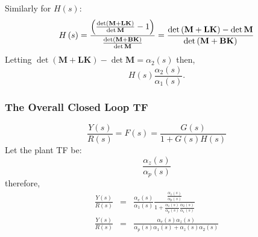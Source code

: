 Similarly for $H(s)$:
\[
H\left( s \right) = \frac{{\left( {\frac{{\det \left( {{\bf{M}} + {\bf{LK}}} \right)}}{{\det {\bf{M}}}} - 1} \right)}}{{\frac{{\det \left( {{\bf{M}} + {\bf{BK}}} \right)}}{{\det {\bf{M}}}}}} = \frac{{\det \left( {{\bf{M}} + {\bf{LK}}} \right) - \det {\bf{M}}}}{{\det \left( {{\bf{M}} + {\bf{BK}}} \right)}}
\]
Letting $\det\left(\mathbf{M}+\mathbf{LK}\right)-\det\mathbf{M}=\alpha_2(s)$ then,
\[
H(s)\frac{\alpha_2(s)}{\alpha_1(s)}.
\]



\subsubsection*{The Overall Closed Loop TF} %
\label{ssub:the_overall_closed_loop_tf}
\[
\frac{Y(s)}{R(s)}=F(s)=\frac{G(s)}{1+G(s)H(s)}
\]
Let the plant TF be:
\[
\frac{\alpha_z(s)}{\alpha_p(s)}
\]
therefore,
\begin{eqnarray*}
	\frac{Y(s)}{R(s)} &=& \frac{\alpha_e(s)}{\alpha_1(s)}\frac{\frac{\alpha_z(s)}{\alpha_p(s)}}{1+\frac{\alpha_z(s)}{\alpha_p(s)}\frac{\alpha_2(s)}{\alpha_1(s)}} \\
	\frac{Y(s)}{R(s)} &=& \frac{\alpha_e(s)\alpha_z(s)}{\alpha_p(s)\alpha_1(s)+\alpha_z(s)\alpha_2(s)}
\end{eqnarray*}

